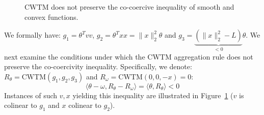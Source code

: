 \documentclass[twoside,11pt]{article}
\newcommand\mb{\mathbb}
\begin{document}
\begin{remark}
\begin{figure}[ht!]
\begin{center}
    \caption{$\mathrm{CWTM}$ does not preserve the co-coercive inequality of smooth and convex functions.}\label{fig:cwtm-noineq}
    \end{center}
    \end{figure}
    We formally have: $g_1 = \theta^T v v$, $g_2 = \theta^T x x = \| x \|_2^2 \theta$ and $g_3 = \underbrace{(\| x \|_2^2 - L)}_{<0} \theta$.
    We next examine the conditions under which the $\mathrm{CWTM}$ aggregation rule does not preserve the co-coercivity inequality. Specifically, we denote:
    $R_\theta = \mathrm{CWTM}\left( g_1, g_2, g_3 \right)$ and $R_\omega = \mathrm{CWTM}\left( 0, 0, -x \right) = 0$:
    \begin{equation*}
        \langle \theta - \omega , R_\theta - R_\omega \rangle
        = \langle \theta , R_\theta \rangle 
        < 0
    \end{equation*}
    Instances of such $v, x$ yielding this inequality are illustrated in Figure~\ref{fig:cwtm-noineq} ($v$ is colinear to $g_1$ and $x$ colinear to $g_2$).

\end{remark}
\end{document}
